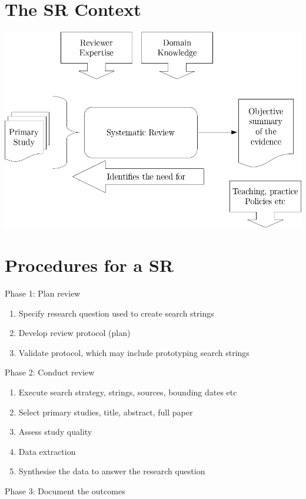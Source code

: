 \documentclass{article}[18pt]
\begin{document}
\section{The SR Context}
\includegraphics[scale=0.5]{srcontext}
\section{Procedures for a SR}
Phase 1: Plan review
\begin{enumerate}
	\item Specify research question used to create search strings
	\item Develop review protocol (plan)
	\item Validate protocol, which may include prototyping search strings
\end{enumerate}
Phase 2: Conduct review
\begin{enumerate}
	\item Execute search strategy, strings, sources, bounding dates etc
	\item Select primary studies, title, abstract, full paper
	\item Assess study quality
	\item Data extraction
	\item Synthesise the data to answer the research question
\end{enumerate}
Phase 3: Document the outcomes
\end{document}
